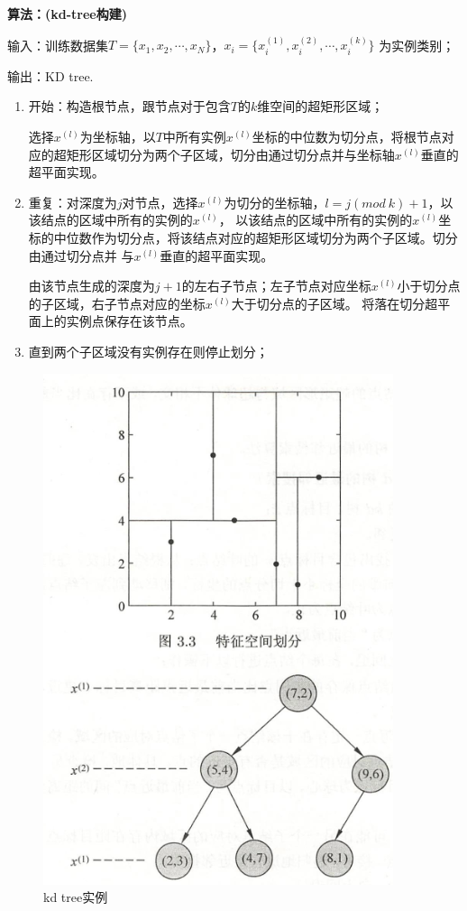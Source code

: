 \begin{framed}

    \textbf{算法：(kd-tree构建)}

    输入：训练数据集$T=\{x_1,x_2,\cdots,x_N\}$，$x_i=\{x^{(1)}_i,x^{(2)}_i,\cdots,x^{(k)}_i\}$
    为实例类别；

    输出：KD tree.

    \begin{enumerate}[itemindent=2em]
        \item 开始：构造根节点，跟节点对于包含$T$的$k$维空间的超矩形区域；
        
        选择$x^{(l)}$为坐标轴，以$T$中所有实例$x^{(l)}$坐标的中位数为切分点，将根节点对应的超矩形区域切分为两个子区域，切分由通过切分点并与坐标轴$x^{(l)}$垂直的超平面实现。

        \item 重复：对深度为$j$对节点，选择$x^{(l)}$为切分的坐标轴，$l=j(mod\ k)+1$，以该结点的区域中所有的实例的$x^{(l)}$，
        以该结点的区域中所有的实例的$x^{(l)}$坐标的中位数作为切分点，将该结点对应的超矩形区域切分为两个子区域。切分由通过切分点并
        与$x^{(l)}$垂直的超平面实现。

        由该节点生成的深度为$j+1$的左右子节点；左子节点对应坐标$x^{(l)}$小于切分点的子区域，右子节点对应的坐标$x^{(l)}$大于切分点的子区域。
        将落在切分超平面上的实例点保存在该节点。

        \item 直到两个子区域没有实例存在则停止划分；

    \end{enumerate}

\end{framed}

\begin{figure}[H]
    \centering
    \includegraphics[scale=0.5]{figures/kd-tree2.png}
    \caption{kd  tree实例}
\end{figure}

